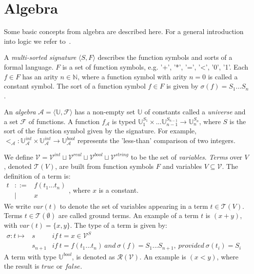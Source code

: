 \section{Algebra}\label{sec:algebra}

Some basic concepts from algebra are described here. For a general introduction into logic we refer to~\cite{Huth:logic}.

A \textit{multi-sorted signature} $\langle S, F\rangle$ describes the function symbols and sorts of a formal language. $F$ is a set of function symbols, e.g. '+', '*', '=', '<', '0', '1'. Each $f\in F$ has an arity $n \in \mathbb{N}$, where a function symbol with arity $n = 0$ is called a constant symbol. The sort of a function symbol $f \in F$ is given by $\sigma(f) = S_1 ... S_n$. 

An \textit{algebra} $\mathcal{A} = \langle \mathbb{U}, \mathcal{F}\rangle$ has a non-empty set $\mathbb{U}$ of constants called a \textit{universe} and a set $\mathcal{F}$ of functions. A function $f_\mathcal{A}$ is typed $\mathbb{U}_1^{S_1} \times ... \mathbb{U}_{n-1}^{S_{n-1}} \rightarrow \mathbb{U}_n^{S_n}$, where $S$ is the sort of the function symbol given by the signature. For example, $<_\mathcal{A}: \mathbb{U}_\mathcal{A}^{int} \times \mathbb{U}_\mathcal{A}^{int} \rightarrow \mathbb{U}_\mathcal{A}^{bool}$ represents the 'less-than' comparison of two integers.
 
We define $\mathcal{V} = \mathcal{V}^{int} \sqcup \mathcal{V}^{real} \sqcup \mathcal{V}^{bool} \sqcup \mathcal{V}^{string}$ to be the set of \textit{variables}. \textit{Terms} over $V$, denoted $\mathcal{T}(V)$, are built from function symbols $F$ and variables $V \subseteq \mathcal{V}$. The definition of a term is:
\vspace{8px}\\
$\begin{array}{lrl}t & ::= & f(t_1 ... t_n) \\ & | & x\end{array}$, where $x$ is a constant.
\vspace{8px}\\
We write $var(t)$ to denote the set of variables appearing in a term $t \in \mathcal{T}(V)$. Terms $t\in \mathcal{T}(\emptyset)$ are called ground terms. An example of a term $\mathit{t}$ is $(x+y)$, with $var(t) = \{x,y\}$. The type of a term is given by:
\vspace{8px}\\
$\begin{array}{lll}\sigma: t \mapsto & s       & \mathit{if}\: t = x \in \mathcal{V}^S \\ 
                                     & s_{n+1} & \mathit{if}\: t = f(t_1 ... t_n) \mathit{\:and\:} \sigma(f) = S_1 ... S_{n+1}\mathit{,\:provided\:} \sigma(t_i) = S_i
\end{array}$
\vspace{8px}\\
A term with type $\mathbb{U}^{bool}$, is denoted as $\mathcal{R}(\mathcal{V})$. An example is $(x < y)$, where the result is $\mathit{true}$ or $\mathit{false}$.

